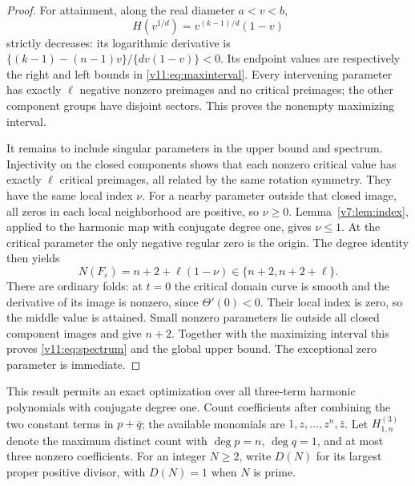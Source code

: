 \documentclass[UTF8,11pt]{ctexart}
\theoremstyle{definition}
\numberwithin{equation}{section}
\begin{document}
\begin{proof}
For attainment, along the real diameter $a<v<b$,
\[
 H(v^{1/d})=v^{(k-1)/d}(1-v)
\]
strictly decreases: its logarithmic derivative is
$\{(k-1)-(n-1)v\}/\{dv(1-v)\}<0$.
Its endpoint values are respectively the right and left bounds
in \eqref{v11:eq:maxinterval}. Every intervening parameter
has exactly $\ell$ negative nonzero preimages and no critical
preimages; the other component groups have disjoint sectors.
This proves the nonempty maximizing interval.

It remains to include singular parameters in the upper bound
and spectrum. Injectivity on the closed components shows that
each nonzero critical value has exactly $\ell$ critical
preimages, all related by the same rotation symmetry. They have
the same local index $\nu$. For a nearby parameter outside that
closed image, all zeros in each local neighborhood are positive,
so $\nu\ge0$. Lemma~\ref{v7:lem:index}, applied to the harmonic
map with conjugate degree one, gives $\nu\le1$.
At the critical parameter the only negative regular zero is
the origin. The degree identity then yields
\[
 N(F_\varepsilon)=n+2+\ell(1-\nu)
 \in\{n+2,n+2+\ell\}.
\]
There are ordinary folds: at $t=0$ the critical domain curve
is smooth and the derivative of its image is nonzero, since
$\Theta'(0)<0$. Their local index is zero, so the middle value
is attained. Small nonzero parameters lie outside all closed
component images and give $n+2$. Together with the maximizing
interval this proves \eqref{v11:eq:spectrum} and the global
upper bound. The exceptional zero parameter is immediate.
\end{proof}

This result permits an exact optimization over all three-term
harmonic polynomials with conjugate degree one. Count coefficients
after combining the two constant terms in $p+\overline q$;
the available monomials are $1,z,\ldots,z^n,\bar z$.
Let $H^{(3)}_{1,n}$ denote the maximum distinct count with
$\deg p=n$, $\deg q=1$, and at most three nonzero coefficients.
For an integer $N\ge2$, write $D(N)$ for its largest proper
positive divisor, with $D(N)=1$ when $N$ is prime.
\end{document}

